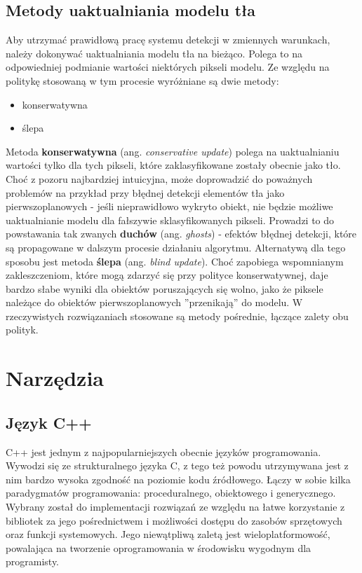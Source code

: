 \subsection{Metody uaktualniania modelu tła}
Aby utrzymać prawidłową pracę systemu detekcji w zmiennych warunkach, należy dokonywać uaktualniania modelu tła na bieżąco. Polega to na odpowiedniej podmianie wartości niektórych pikseli modelu. Ze względu na politykę stosowaną w tym procesie wyróżniane są dwie metody:
\begin{itemize}
\item konserwatywna
\item ślepa
\end{itemize} 
Metoda \textbf{konserwatywna} (ang. \textit{conservative update}) polega na uaktualnianiu wartości tylko dla tych pikseli, które zaklasyfikowane zostały obecnie jako tło. Choć z pozoru najbardziej intuicyjna, może doprowadzić do poważnych problemów na przykład przy błędnej detekcji elementów tła jako pierwszoplanowych - jeśli nieprawidłowo wykryto obiekt, nie będzie możliwe uaktualnianie modelu dla fałszywie sklasyfikowanych pikseli. Prowadzi to do powstawania tak zwanych \textbf{duchów} (ang. \textit{ghosts}) - efektów błędnej detekcji, które są propagowane w dalszym procesie działaniu algorytmu. Alternatywą dla tego sposobu jest metoda \textbf{ślepa} (ang. \textit{blind update}). Choć zapobiega wspomnianym zakleszczeniom, które mogą zdarzyć się przy polityce konserwatywnej, daje bardzo słabe wyniki dla obiektów poruszających się wolno, jako że piksele należące do obiektów pierwszoplanowych ''przenikają'' do modelu. W rzeczywistych rozwiązaniach stosowane są metody pośrednie, łączące zalety obu polityk.

\section{Narzędzia}
\subsection{Język C++}
C++ jest jednym z najpopularniejszych obecnie języków programowania. Wywodzi się ze strukturalnego języka C, z tego też powodu utrzymywana jest z nim bardzo wysoka zgodność na poziomie kodu źródłowego. Łączy w sobie kilka paradygmatów programowania: proceduralnego, obiektowego i generycznego. Wybrany został do implementacji rozwiązań ze względu na łatwe korzystanie z bibliotek za jego pośrednictwem i możliwości dostępu do zasobów sprzętowych oraz funkcji systemowych. Jego niewątpliwą zaletą jest wieloplatformowość, powalająca na tworzenie oprogramowania w środowisku wygodnym dla programisty.
